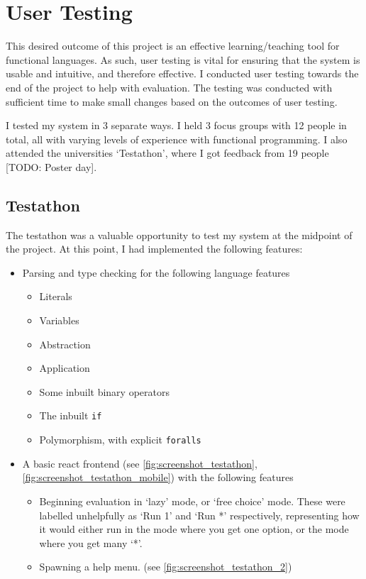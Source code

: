 \chapter{User Testing}
\label{chap:evaluation}

This desired outcome of this project is an effective learning/teaching tool for functional languages. As such, user testing is vital for ensuring that the system is usable and intuitive, and therefore effective. I conducted user testing towards the end of the project to help with evaluation. The testing was conducted with sufficient time to make small changes based on the outcomes of user testing.

I tested my system in 3 separate ways. I held 3 focus groups with 12 people in total, all with varying levels of experience with functional programming. I also attended the universities `Testathon', where I got feedback from 19 people [TODO: Poster day].


\section{Testathon}
The testathon was a valuable opportunity to test my system at the midpoint of the project. At this point, I had implemented the following features:

\begin{itemize}
    \item Parsing and type checking for the following language features
    \begin{itemize}
        \item Literals
        \item Variables
        \item Abstraction 
        \item Application
        \item Some inbuilt binary operators 
        \item The inbuilt \verb|if|
        \item Polymorphism, with explicit \verb|foralls|
    \end{itemize}
\item A basic react frontend (see \ref{fig:screenshot_testathon}, \ref{fig:screenshot_testathon_mobile}) with the following features
\begin{itemize}
    \item Beginning evaluation in `lazy' mode, or `free choice' mode. These were labelled unhelpfully as `Run 1' and `Run *' respectively, representing how it would either run in the mode where you get one option, or the mode where you get many `*'.
    \item Spawning a help menu. (see \ref{fig:screenshot_testathon_2})
\end{itemize}
\end{itemize}
